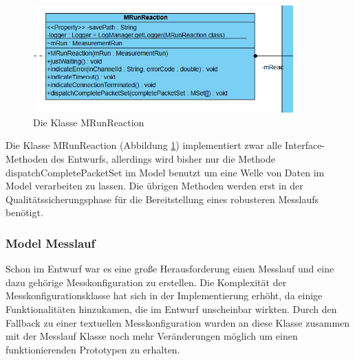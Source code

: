 \documentclass[parskip=full]{scrartcl}
\begin{document}
\begin{figure}[htbp]
	\begin{center}
		\includegraphics[width = 10cm]{Grafiken/mrunreaction.PNG}
		\caption{Die Klasse MRunReaction}
		\label{mrunreaction}
	\end{center}
\end{figure}


Die Klasse MRunReaction (Abbildung \ref{mrunreaction}) implementiert zwar alle Interface-Methoden des Entwurfs, allerdings wird bisher nur die Methode dispatchCompletePacketSet im Model benutzt um eine Welle von Daten im Model verarbeiten zu lassen. Die übrigen Methoden werden erst in der Qualitätssicherungsphase für die Bereitstellung eines robusteren Messlaufs benötigt.

\subsubsection{Model Messlauf}

Schon im Entwurf war es eine große Herausforderung einen Messlauf und eine dazu gehörige Messkonfiguration zu erstellen. Die Komplexität der Messkonfigurationsklasse hat sich in der Implementierung erhöht, da einige Funktionalitäten hinzukamen, die im Entwurf unscheinbar wirkten. Durch den Fallback zu einer textuellen Messkonfiguration wurden an diese Klasse zusammen mit der Messlauf Klasse noch mehr Veränderungen möglich um einen funktionierenden Prototypen zu erhalten.
\end{document}
